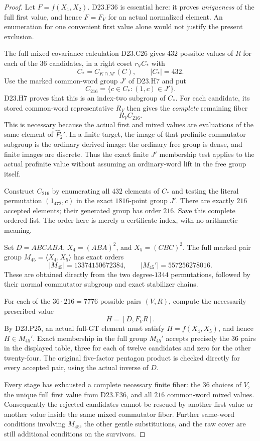 \begin{proof}
Let $F=f(X_1,X_2)$. D23.F36 is essential here: it proves
\emph{uniqueness} of the full first value, and hence
$F=F_V$ for an actual normalized element. An enumeration
for one convenient first value alone would not justify
the present exclusion.

The full mixed covariance calculation D23.C26 gives
$432$ possible values of $R$ for each of the $36$
candidates, in a right coset $r_VC_*$ with
\[
                    C_*=C_{K\cap M'}(C),\qquad |C_*|=432.
\]
Use the marked common-word group $J'$ of D23.H7 and put
\[
 C_{216}=\{c\in C_*:(1,c)\in J'\}.
\]
D23.H7 proves that this is an index-two subgroup of $C_*$.
For each candidate, its stored common-word representative
$R_V$ then gives the \emph{complete} remaining fiber
\[
                         R_V C_{216}.
\]
This is necessary because the actual first and mixed values
are evaluations of the same element of $\widehat F_2'$.
In a finite target, the image of that profinite commutator
subgroup is the ordinary derived image: the ordinary free
group is dense, and finite images are discrete. Thus the
exact finite $J'$ membership test applies to the actual
profinite value without assuming an ordinary-word lift in
the free group itself.

Construct $C_{216}$ by enumerating all $432$ elements of
$C_*$ and testing the literal permutation
$(1_{472},c)$ in the exact $1816$-point group $J'$.
There are exactly $216$ accepted elements; their generated
group has order $216$. Save this complete ordered list.
The order here is merely a certificate index, with no
arithmetic meaning.

Set $D=ABCABA$, $X_4=(ABA)^2$, and $X_5=(CBC)^2$.
The full marked pair group $M_{45}=\langle X_4,X_5\rangle$
has exact orders
\[
 |M_{45}|=13374150672384,\qquad
 |M_{45}'|=557256278016.
\]
These are obtained directly from the two degree-$1344$
permutations, followed by their normal commutator subgroup
and exact stabilizer chains.

For each of the $36\cdot216=7776$ possible pairs $(V,R)$,
compute the necessarily prescribed value
\[
                        H=[D,F_VR].
\]
By D23.P25, an actual full-GT element must satisfy
$H=f(X_4,X_5)$, and hence $H\in M_{45}'$.
Exact membership in the full group $M_{45}'$ accepts
precisely the $36$ pairs in the displayed table, three
for each of twelve candidates and zero for the other
twenty-four. The original five-factor pentagon product
is checked directly for every accepted pair, using the
actual inverse of $D$.

Every stage has exhausted a complete necessary finite
fiber: the $36$ choices of $V$, the unique full first
value from D23.F36, and all $216$ common-word mixed
values. Consequently the rejected candidates cannot be
rescued by another first value or another value inside
the same mixed commutator fiber. Further same-word
conditions involving $M_{45}$, the other gentle
substitutions, and the raw cover are still additional
conditions on the survivors.
\end{proof}

